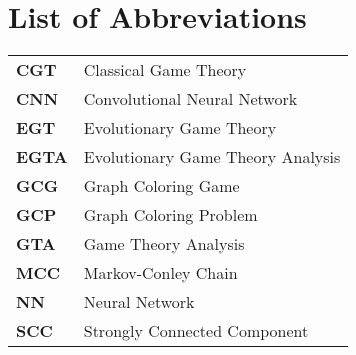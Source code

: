 \section*{List of Abbreviations}

\begin{table}[h]
    \raggedright
    \begin{tabular}{l l}
        \textbf{CGT}  & Classical Game Theory \\
        \textbf{CNN}  & Convolutional Neural Network \\
        \textbf{EGT}  & Evolutionary Game Theory \\
        \textbf{EGTA} & Evolutionary Game Theory Analysis \\
        \textbf{GCG}  & Graph Coloring Game \\
        \textbf{GCP}  & Graph Coloring Problem \\
        \textbf{GTA}  & Game Theory Analysis \\
        \textbf{MCC}  & Markov-Conley Chain \\
        \textbf{NN}   & Neural Network \\
        \textbf{SCC}  & Strongly Connected Component \\
    \end{tabular}
\end{table}